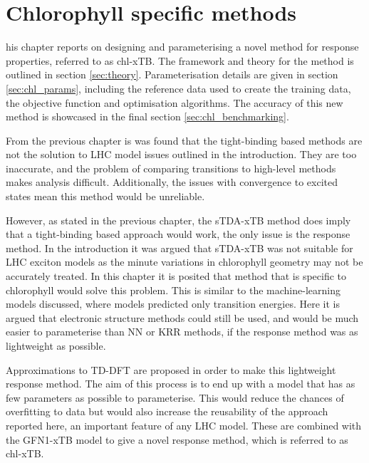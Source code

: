 %
%
\let\textcircled=\pgftextcircled
\chapter{Chlorophyll specific methods}
\label{chap:chl_xtb}

his chapter reports on designing and parameterising a novel method for
response properties, referred to as chl-xTB. The framework and theory for the method
is outlined in section \ref{sec:theory}. Parameterisation details are given in section \ref{sec:chl_params},
including the reference data used to create the training data, the objective function
and optimisation algorithms. The accuracy of this new method is showcased in the
final section \ref{sec:chl_benchmarking}.

From the previous chapter is was found that the tight-binding based \dxtb methods
are not the solution to LHC model issues outlined in the introduction. They are
too inaccurate, and the problem of comparing transitions to high-level methods makes
analysis difficult. Additionally, the issues with convergence to excited states 
mean this method would be unreliable.

However, as stated in the previous chapter, the sTDA-xTB method does imply that
a tight-binding based approach would work, the only issue is the response method.
In the introduction it was argued that sTDA-xTB was not suitable for LHC exciton
models as the minute variations in chlorophyll geometry may not be accurately treated.
In this chapter it is posited that method that is specific to chlorophyll would
solve this problem. This is similar to the machine-learning models discussed, where
models predicted only \Qy transition energies. Here it is argued that electronic 
structure methods could still be used, and would be much easier to parameterise
than NN or KRR methods, if the response method was as lightweight as possible. 

Approximations to TD-DFT are proposed in order to make this lightweight response
method. The aim of this process is to end up with a model that has as few parameters
as possible to parameterise. This would reduce the chances of overfitting to data
but would also increase the reusability of the approach reported here, an important
feature of any LHC model. These are combined with the GFN1-xTB model to give a novel
response method, which is referred to as chl-xTB.

